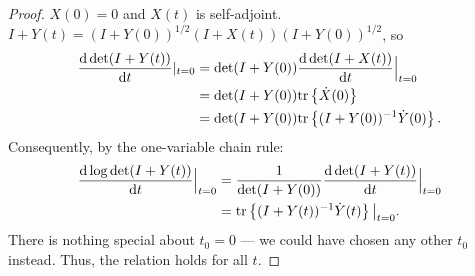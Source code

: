\documentclass{amsart}
\numberwithin{equation}{section}
\begin{document}
\begin{proof}
  $X(0) = 0$ and $X(t)$ is self-adjoint.
  $I+Y(t) = (I+Y(0))^{1/2}(I+X(t))(I+Y(0))^{1/2}$, so
  \begin{align*}
    \frac{\text{\textup{d}} \det (I+Y(t))}{\text{\textup{d}} t}|_{t=0} 
    &= \det (I+Y(0))\frac{\text{\textup{d}} \det (I+X(t))}{\text{\textup{d}} t}\Big |_{t=0} \\
    &= \det (I+Y(0)) \textup{tr}\left \{\dot{X}(0) \right \} \\
    &= \det (I+Y(0)) \textup{tr}\left \{(I+Y(0))^{-1} \dot{Y}(0) \right \}.
  \end{align*}
  Consequently, by the one-variable chain rule:
  \begin{align*}
    \frac{\text{\textup{d}} \log \det (I+Y(t))}{\text{\textup{d}} t}\Big |_{t=0} &=
    \frac{1}{\det (I+Y(0))}\frac{\text{\textup{d}} \det (I+Y(t))}{\text{\textup{d}} t}\Big |_{t=0} \\ 
    &= \textup{tr}\left \{ (I+Y(t))^{-1} \dot{Y}(t) \right \} \big |_{t=0}.
  \end{align*}
  There is nothing special about $t_0 = 0$ --- we could have chosen
  any other $t_0$ instead. Thus, the relation holds for all $t$.
\end{proof}
\end{document}
